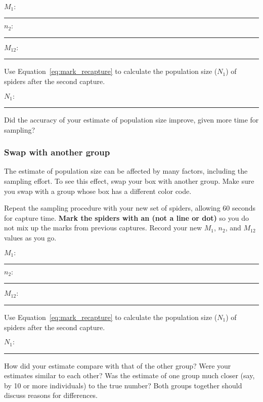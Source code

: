\documentclass[12pt, hidelinks]{exam}
\begin{document}
\begin{questions}
	\begin{multicols}{2}
	$M_1\colon$  \rule{0.75in}{0.4pt} \bigskip
	
	$n_2\colon$ \rule{0.75in}{0.4pt}
	
	\columnbreak
	
	$M_{12}\colon$ \rule{0.75in}{0.4pt} \bigskip
	
\end{multicols}

\question
Use Equation~\ref{eq:mark_recapture} to calculate the population size ($N_1$) of
spiders after the second capture. \bigskip

$N_1\colon$ \rule{0.75in}{0.4pt}

\question
Did the accuracy of your estimate of population size improve, given more time for sampling? 

\vspace*{2\baselineskip}


\subsubsection*{Swap with another group}

The estimate of population size can be affected by many factors, including the sampling effort. To see this effect, swap your box with another group. Make sure you swap with a group whose box has a different color code.


Repeat the sampling procedure with your new set of spiders, allowing 60 seconds for capture time. \textbf{Mark the spiders with an  (not a line or dot)} so you do not mix up the marks from previous captures. Record your new $M_1$, $n_2$, and $M_{12}$ values as you go. \bigskip

	\begin{multicols}{2}
	$M_1\colon$  \rule{0.75in}{0.4pt} \bigskip
	
	$n_2\colon$ \rule{0.75in}{0.4pt}
	
	\columnbreak
	
	$M_{12}\colon$ \rule{0.75in}{0.4pt} \bigskip
	
\end{multicols}

\question
Use Equation~\ref{eq:mark_recapture} to calculate the population size ($N_1$) of
spiders after the second capture. \bigskip

$N_1\colon$ \rule{0.75in}{0.4pt}

\question
How did your estimate compare with that of the other group? Were your estimates similar to each other? Was the estimate of one group much closer (say, by 10 or more individuals) to the true number? Both groups together should discuss reasons for differences.


\end{questions}
\end{document}
